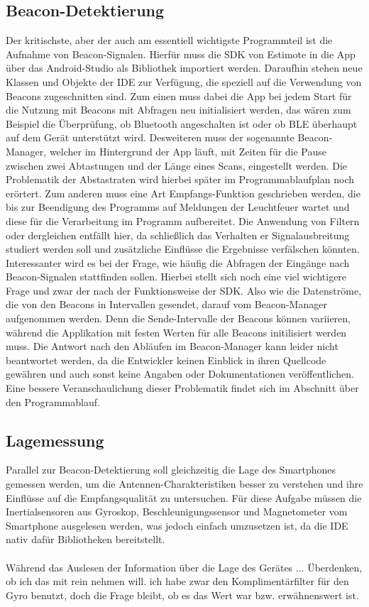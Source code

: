 \subsection{Beacon-Detektierung}
Der kritischste, aber der auch am essentiell wichtigste Programmteil ist die Aufnahme von Beacon-Signalen. Hierfür muss die SDK von Estimote in die App über das Android-Studio als Bibliothek importiert werden. Daraufhin stehen neue Klassen und Objekte der IDE zur Verfügung, die speziell auf die Verwendung von Beacons zugeschnitten sind. Zum einen muss dabei die App bei jedem Start für die Nutzung mit Beacons mit Abfragen neu initialisiert werden, das wären zum Beispiel die Überprüfung, ob Bluetooth angeschalten ist oder ob BLE überhaupt auf dem Gerät unterstützt wird. Desweiteren muss der sogenannte Beacon-Manager, welcher im Hintergrund der App läuft, mit Zeiten für die Pause zwischen zwei Abtastungen und der Länge eines Scans, eingestellt werden. Die Problematik der Abstastraten wird hierbei später im Programmablaufplan noch erörtert. Zum anderen muss eine Art Empfangs-Funktion geschrieben werden, die bis zur Beendigung des Programms auf Meldungen der Leuchtfeuer wartet und diese für die Verarbeitung im Programm aufbereitet. Die Anwendung von Filtern oder dergleichen entfällt hier, da schließlich das Verhalten er Signalausbreitung studiert werden soll und zusätzliche Einflüsse die Ergebnisse verfälschen könnten. Interessanter wird es bei der Frage, wie häufig die Abfragen der Eingänge nach Beacon-Signalen stattfinden sollen. Hierbei stellt sich noch eine viel wichtigere Frage und zwar der nach der Funktionsweise der SDK. Also wie die Datenströme, die von den Beacons in Intervallen gesendet, darauf vom Beacon-Manager aufgenommen werden. Denn die Sende-Intervalle der Beacons können variieren, während die Applikation mit festen Werten für alle Beacons initilisiert werden muss. Die Antwort nach den Abläufen im Beacon-Manager kann leider nicht beantwortet werden, da die Entwickler keinen Einblick in ihren Quellcode gewähren und auch sonst keine Angaben oder Dokumentationen veröffentlichen. Eine bessere Veranschaulichung dieser Problematik findet sich im Abschnitt über den Programmablauf.
\subsection{Lagemessung}
Parallel zur Beacon-Detektierung soll gleichzeitig die Lage des Smartphones gemessen werden, um die Antennen-Charakteristiken besser zu verstehen und ihre Einflüsse auf die Empfangsqualität zu untersuchen. Für diese Aufgabe müssen die Inertialsensoren aus Gyroskop, Beschleunigungssensor und Magnetometer vom Smartphone ausgelesen werden, was jedoch einfach umzusetzen ist, da die IDE nativ dafür Bibliotheken bereitstellt. \\ \\
Während das Auslesen der Information über die Lage des Gerätes ... Überdenken, ob ich das mit rein nehmen will. ich habe zwar den Komplimentärfilter für den Gyro benutzt, doch die Frage bleibt, ob es das Wert war bzw. erwähnenswert ist.
